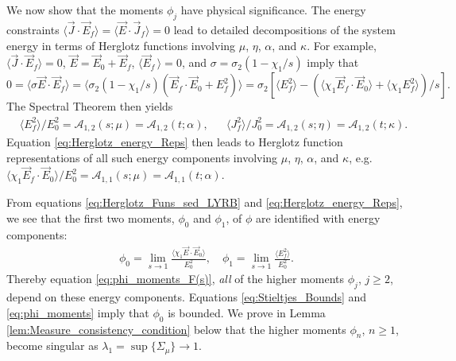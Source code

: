 \documentclass[english,12pt,jmp,graphicx]{revtex4-1}
\begin{document}
We now show that the moments $\phi_j$ have physical significance. The
energy constraints $\langle\vec{J}\cdot\vec{E}_f\rangle=\langle\vec{E}\cdot\vec{J}_f\rangle=0$ lead to
detailed decompositions of the system energy in terms of Herglotz
functions involving $\mu$, $\eta$, $\alpha$, and $\kappa$. For example,
$\langle\vec{J}\cdot\vec{E}_f\rangle=0$, $\vec{E}=\vec{E}_0+\vec{E}_f$,
$\langle\vec{E}_f\,\rangle=0$, and $\sigma=\sigma_2(1-\chi_1/s)$ imply that
$0=\langle\sigma\vec{E}\cdot\vec{E}_f\rangle=\langle\sigma_2(1-\chi_1/s)(\vec{E}_f\cdot\vec{E}_0+E_f^2)\rangle
=\sigma_2\left[\langle E_f^2\rangle- (\langle\chi_1\vec{E}_f\cdot\vec{E}_0\rangle+\langle\chi_1E_f^2\rangle)/s\right].$
The Spectral Theorem \cite{Reed-1980} then yields
%
\begin{align}\label{eq:Herglotz_energy_Reps}
 &\langle E_f^2\rangle/E_0^2=\mathcal{A}_{1,2}(s;\mu)=\mathcal{A}_{1,2}(t;\alpha),
 &&\langle J_f^2\rangle/J_0^2=\mathcal{A}_{1,2}(s;\eta)=\mathcal{A}_{1,2}(t;\kappa).
\end{align}
%
Equation \eqref{eq:Herglotz_energy_Reps} then leads to Herglotz
function representations of all such energy components involving $\mu$,
$\eta$, $\alpha$, and $\kappa$,
e.g. $\langle\chi_1\vec{E}_f\cdot\vec{E}_0\rangle/E_0^2=\mathcal{A}_{1,1}(s;\mu)=\mathcal{A}_{1,1}(t;\alpha)$. 

From equations 
\eqref{eq:Herglotz_Funs_sed_LYRB} and \eqref{eq:Herglotz_energy_Reps}, we  
see that the first two moments, $\phi_0$ and $\phi_1$, of $\phi$ are identified
with energy components:     
%
\begin{align}\label{eq:phi_energy_relations}
  \phi_0=\lim_{s\to1}\frac{\langle\chi_1\vec{E}\cdot\vec{E}_0\rangle}{E_0^2},   \quad
  \phi_1=\lim_{s\to1}\frac{\langle E_f^2\rangle}{E_0^2}.
\end{align}
%
Thereby equation \eqref{eq:phi_moments_F(s)}, \emph{all} of the higher
moments $\phi_j$, $j\geq2$, depend on these energy components. Equations
\eqref{eq:Stieltjes_Bounds} and \eqref{eq:phi_moments} imply that
$\phi_0$ is bounded. We prove in Lemma
\ref{lem:Measure_consistency_condition} below that the higher moments
$\phi_n$, $n\geq1$, become singular as $\lambda_1=\sup\{\Sigma_\mu\}\to1$.
\end{document}
